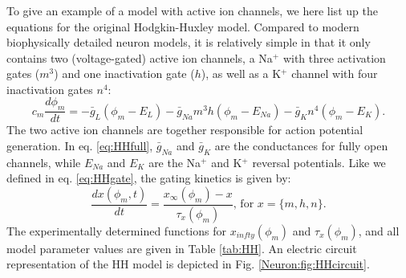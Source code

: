 \subsubsection{}
To give an example of a model with active ion channels, we here list up the equations for the original Hodgkin-Huxley model. Compared to modern biophysically detailed neuron models, it is relatively simple in that it only contains two (voltage-gated) active ion channels, a Na$^+$ with three activation gates ($m^3$) and one inactivation gate ($h$), as well as a K$^+$ channel with four inactivation gates $n^4$:
\begin{equation}
c_m \frac{d\phi_m}{dt} = -\bar{g}_L(\phi_m-E_L) - \bar{g}_{Na} m^3 h (\phi_m - E_{Na}) - \bar{g}_{K} n^4 (\phi_m - E_{K}).
\label{eq:HHfull}
\end{equation}
The two active ion channels are together responsible for action potential generation. In eq. \ref{eq:HHfull}, $\bar{g}_{Na}$ and $\bar{g}_K$ are the conductances for fully open channels, while $E_{Na}$ and $E_{K}$ are the Na$^+$ and K$^+$ reversal potentials. Like we defined in eq. \ref{eq:HHgate}, the gating kinetics is given by: 
\begin{equation}
\frac{dx(\phi_m,t)}{dt} = \frac{x_{\infty}(\phi_m) - x}{\tau_x(\phi_m)},  \, \text{for } x = \{m,h,n\}.
\label{eq:HHgates}
\end{equation}
The experimentally determined functions for $x_{infty}(\phi_m)$ and $\tau_x(\phi_m)$, and all model parameter values are given in Table \ref{tab:HH}. An electric circuit representation of the HH model is depicted in Fig. \ref{Neuron:fig:HHcircuit}.

